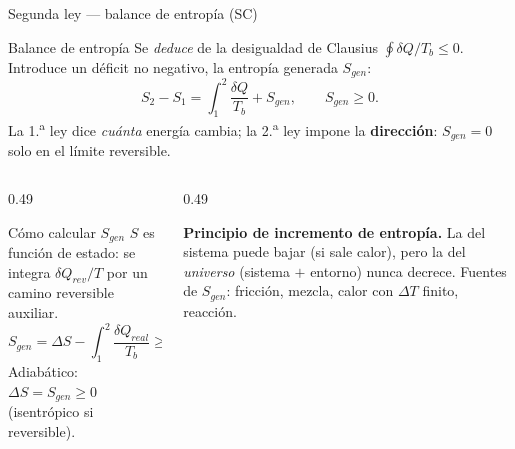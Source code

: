 \documentclass[aspectratio=169,10pt]{beamer}
\begin{document}
\begin{frame}{Segunda ley --- balance de entropía (SC)}
\begin{cardidea}{Balance de entropía}{\faRandom}
Se \emph{deduce} de la desigualdad de Clausius $\oint \delta Q/T_b\le0$. Introduce un déficit no negativo, la entropía generada $S_{gen}$:
$$S_2-S_1=\int_1^2\frac{\delta Q}{T_b}+S_{gen},\qquad S_{gen}\ge0.$$
La 1.\textsuperscript{a} ley dice \emph{cuánta} energía cambia; la 2.\textsuperscript{a} ley impone la \textbf{dirección}: $S_{gen}=0$ solo en el límite reversible.
\end{cardidea}
\vspace{1.4mm}
\begin{columns}[T]
\begin{column}{0.49\textwidth}
\begin{cardgear}{Cómo calcular $S_{gen}$}{\faCalculator}
{\footnotesize
$S$ es función de estado: se integra $\delta Q_{rev}/T$ por un camino reversible auxiliar.
$$S_{gen}=\Delta S-\int_1^2\frac{\delta Q_{real}}{T_b}\ge0.$$
Adiabático: $\Delta S=S_{gen}\ge0$ (isentrópico si reversible).}
\end{cardgear}
\end{column}
\begin{column}{0.49\textwidth}
\begin{cardnota}[\faInfoCircle]
\textbf{Principio de incremento de entropía.} La del sistema puede bajar (si sale calor), pero la del \emph{universo} (sistema $+$ entorno) nunca decrece. Fuentes de $S_{gen}$: fricción, mezcla, calor con $\Delta T$ finito, reacción.
\end{cardnota}
\end{column}
\end{columns}
\end{frame}
\end{document}
